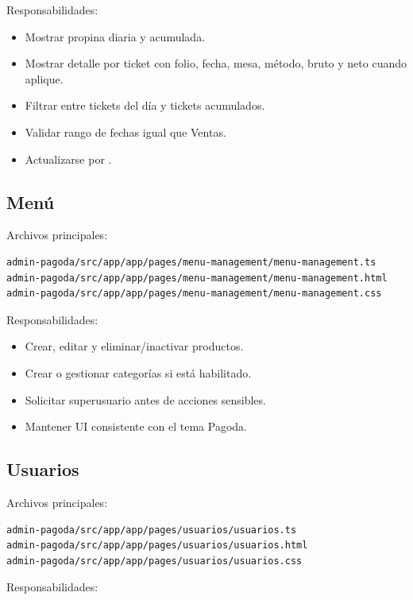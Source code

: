 \documentclass[11pt,letterpaper,openany]{report}
\newcommand{\code}[1]{\texttt{\detokenize{#1}}}
\begin{document}
Responsabilidades:

\begin{itemize}[leftmargin=*]
  \item Mostrar propina diaria y acumulada.
  \item Mostrar detalle por ticket con folio, fecha, mesa, método, bruto y neto cuando aplique.
  \item Filtrar entre tickets del día y tickets acumulados.
  \item Validar rango de fechas igual que Ventas.
  \item Actualizarse por \code{/topic/propinas}.
\end{itemize}

\subsection{Menú}

Archivos principales:

\begin{lstlisting}
admin-pagoda/src/app/app/pages/menu-management/menu-management.ts
admin-pagoda/src/app/app/pages/menu-management/menu-management.html
admin-pagoda/src/app/app/pages/menu-management/menu-management.css
\end{lstlisting}

Responsabilidades:

\begin{itemize}[leftmargin=*]
  \item Crear, editar y eliminar/inactivar productos.
  \item Crear o gestionar categorías si está habilitado.
  \item Solicitar superusuario antes de acciones sensibles.
  \item Mantener UI consistente con el tema Pagoda.
\end{itemize}

\subsection{Usuarios}

Archivos principales:

\begin{lstlisting}
admin-pagoda/src/app/app/pages/usuarios/usuarios.ts
admin-pagoda/src/app/app/pages/usuarios/usuarios.html
admin-pagoda/src/app/app/pages/usuarios/usuarios.css
\end{lstlisting}

Responsabilidades:
\end{document}

